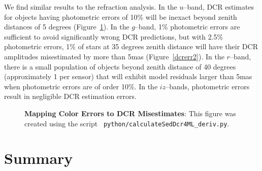 \documentclass[DM,toc]{lsstdoc}
\begin{document}
We find similar results to the refraction analysis.  In the $u$--band,
DCR estimates for objects having photometric errors of 10\% will be
inexact beyond zenith distances of 5 degrees (Figure~\ref{dcrerr}).
In the $g$--band, 1\% photometric errors are sufficient to avoid
significantly wrong DCR predictions, but with 2.5\% photometric
errors, 1\% of stars at 35 degrees zenith distance will have their DCR
amplitudes misestimated by more than 5mas (Figure~\ref{dcrerr2}).  In
the $r$--band, there is a small population of objects beyond zenith
distance of 40 degrees (approximately 1 per sensor) that will exhibit
model residuals larger than 5mas when photometric errors are of order
10\%.  In the $iz$--bands, photometric errors result in negligible DCR
estimation errors.

\begin{figure}[!t]
    \centering
    \caption{{\bf Mapping Color Errors to DCR Misestimates}: This
      figure was created using the script {\tt
        python/calculateSedDcr4ML\_deriv.py}.}
    \label{dcrerr}
\end{figure}

\section{Summary}

\end{document}
